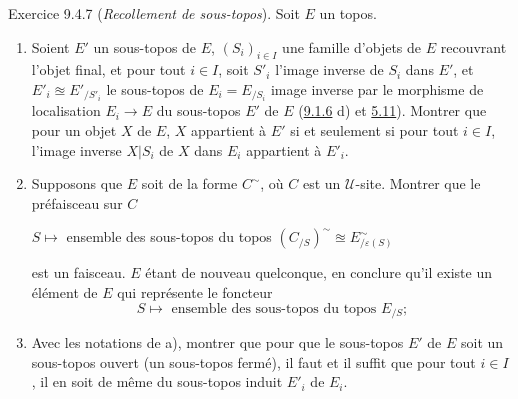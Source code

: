 \begin{enonce*}[remark]{Exercice 9.4.7}
(\emph{Recollement de sous-topos}). Soit $E$ un topos.
\begin{enumerate}
\renewcommand{\theenumi}{\alph{enumi}}
\renewcommand{\labelenumi}{\theenumi)}
\item Soient $E'$ un sous-topos de $E$, $(S_i)_{i\in I}$ une famille
d'objets de $E$ recouvrant l'objet final, et pour tout $i\in I$,
soit $S'_i$ l'image inverse de $S_i$ dans $E'$, et $E'_i\approxeq
E'_{/S'_i}$ le sous-topos de $E_i=E_{/S_i}$ image inverse par le
morphisme de localisation $E_i\rightarrow E$ du sous-topos $E'$ de
$E$ (\hyperref[IV.exer9.1.6]{9.1.6} d) et \hyperref[IV.prop5.11]{5.11}). Montrer que pour
un objet $X$ de $E$, $X$ appartient à $E'$ si et seulement si pour
tout $i\in I$, l'image inverse $X| S_i$ de $X$ dans $E_i$ appartient
à $E'_i$.

\item Supposons que $E$ soit de la forme $C^{\sim}$, où $C$ est un
$𝒰$-site. Montrer que le préfaisceau sur $C$
\begin{center}
$S\mapsto$ ensemble des sous-topos du topos
$(C_{/S})^{\sim}\approxeq E^{\sim}_{/\varepsilon(S)}$
\end{center}
est un faisceau. $E$ étant de nouveau quelconque, en conclure qu'il
existe un élément de $E$ qui représente le foncteur
$$
\text{$S\mapsto$ ensemble des sous-topos du topos $E_{/S}$;}
$$

\item Avec les notations de a), montrer que pour que le sous-topos
$E'$ de $E$ soit un sous-topos ouvert (\resp un sous-topos fermé),
il faut et il suffit que pour tout $i\in I$, il en soit de même du
sous-topos induit $E'_i$ de $E_i$.
\end{enumerate}
\end{enonce*}

